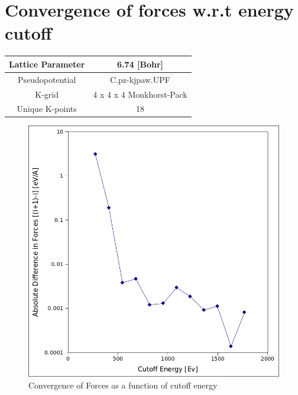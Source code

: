 \documentclass{article}
\begin{document}
\section*{Convergence of forces w.r.t energy cutoff}
\begin{center}
\begin{tabular}{|c|c|}
  \hline
  Lattice Parameter & 6.74 [Bohr] \\ \hline
  Pseudopotential & C.pz-kjpaw.UPF \\ \hline
  K-grid & 4 x 4 x 4 Monkhorst-Pack  \\ \hline
  Unique K-points & 18  \\ \hline
\end{tabular}
\end{center}
\begin{figure}[h!]
\centering
\includegraphics[totalheight=0.5\textheight]{forces.png}
\caption{Convergence of Forces as a function of cutoff energy}
\label{fig:aNicePicture}
\end{figure}
\end{document}
